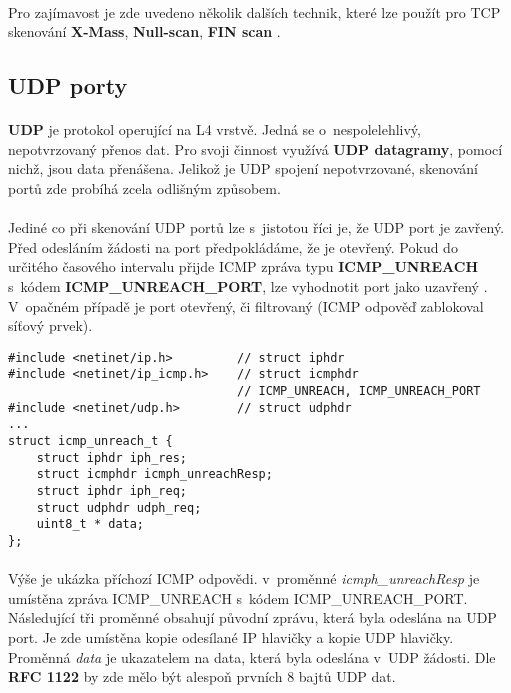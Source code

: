 \documentclass[a4paper,11pt,onecolumn,notitlepage]{article}
\begin{document}
\paragraph{} Pro zajímavost je zde uvedeno několik dalších technik, které lze použít pro TCP skenování \textbf{X-Mass}, \textbf{Null-scan}, \textbf{FIN scan} \cite{WIKI_portScanningTechiques}.
\subsection{UDP porty}\label{fig:CHAPTER_UDP}
\paragraph{} \textbf{UDP} \cite{WIKI_UDP} je protokol operující na L4 vrstvě. Jedná se o~nespolelehlivý, nepotvrzovaný přenos dat. Pro svoji činnost využívá \textbf{UDP datagramy}, pomocí nichž, jsou data přenášena. Jelikož je UDP spojení nepotvrzované, skenování portů zde probíhá zcela odlišným způsobem.

\paragraph{} Jediné co při skenování UDP portů lze s~jistotou říci je, že UDP port je zavřený. Před odesláním žádosti na port předpokládáme, že je otevřený. Pokud do určitého časového intervalu přijde ICMP zpráva typu \textbf{ICMP\_UNREACH} s~kódem \textbf{ICMP\_UNREACH\_PORT}, lze vyhodnotit port jako uzavřený \cite{RFC1122}. V~opačném případě je port otevřený, či filtrovaný (ICMP odpověď zablokoval síťový prvek).
\begin{lstlisting}[frame=single,caption={Struktura příchozího ICMP UNREACH paketu},captionpos=b]
#include <netinet/ip.h>         // struct iphdr
#include <netinet/ip_icmp.h>    // struct icmphdr
                                // ICMP_UNREACH, ICMP_UNREACH_PORT
#include <netinet/udp.h>        // struct udphdr
...
struct icmp_unreach_t {
    struct iphdr iph_res;
    struct icmphdr icmph_unreachResp;
    struct iphdr iph_req;
    struct udphdr udph_req;
    uint8_t * data;
};
\end{lstlisting}\label{fig:ICMP_UNREACH_PORT}
\paragraph{} Výše je ukázka příchozí ICMP odpovědi. v~proměnné \emph{icmph\_unreachResp} je umístěna zpráva ICMP\_UNREACH s~kódem ICMP\_UNREACH\_PORT. Následující tři proměnné obsahují původní zprávu, která byla odeslána na UDP port. Je zde umístěna kopie odesílané IP hlavičky a kopie UDP hlavičky. Proměnná \emph{data} je ukazatelem na data, která byla odeslána v~UDP žádosti. Dle \textbf{RFC 1122} \cite{RFC1122} by zde mělo být alespoň prvních 8 bajtů UDP dat.
\newpage
\end{document}
